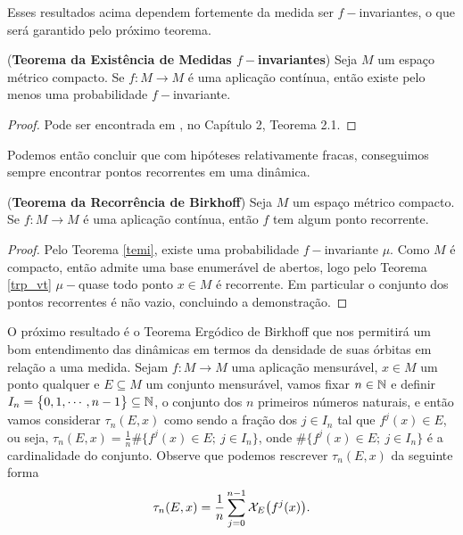 Esses resultados acima dependem fortemente da medida ser $f-$invariantes, o que será garantido pelo próximo teorema.

\begin{teorema}\label{temi}(\textbf{Teorema da Existência de Medidas $f-$invariantes}) Seja $M$ um espaço métrico compacto. Se $f:M\to M$ é uma aplicação contínua, então existe pelo menos uma probabilidade $f-$invariante.
\end{teorema}

\begin{proof} Pode ser encontrada em \cite{viana}, no Capítulo 2, Teorema 2.1.
\end{proof}

Podemos então concluir que com hipóteses relativamente fracas, conseguimos sempre encontrar pontos recorrentes em uma dinâmica.

\begin{corolario}\label{trb} (\textbf{Teorema da Recorrência de Birkhoff}) Seja $M$ um espaço métrico compacto. Se $f:M\to M$ é uma aplicação contínua, então $f$ tem algum ponto recorrente.
\end{corolario}

\begin{proof} Pelo Teorema \ref{temi}, existe uma probabilidade $f-$invariante $\mu$. Como $M$ é compacto, então admite uma base enumerável de abertos, logo pelo Teorema \ref{trp_vt} $\mu-$quase todo ponto $x\in M$ é recorrente. Em particular o conjunto dos pontos recorrentes é não vazio, concluindo a demonstração.
\end{proof}

O próximo resultado é o Teorema Ergódico de Birkhoff que nos permitirá um bom entendimento das dinâmicas em termos da densidade de suas órbitas em relação a uma medida. Sejam $f:M\to M$ uma aplicação mensurável, $x\in M$ um ponto qualquer e $E\subseteq M$ um conjunto mensurável, vamos fixar $n\in\mathbb{N}$ e definir $I_n=\big\{0,1,\cdots,n-1\big\}\subseteq\mathbb{N}$, o conjunto dos $n$ primeiros números naturais, e então vamos considerar $\tau_n(E,x)$ como sendo a fração dos $j\in I_n$ tal que $f^j(x)\in E$, ou seja, $\tau_n(E,x) = \frac{1}{n}\#\big\{f^j(x)\in E;\ j\in I_n\big\}$, onde $\#\big\{f^j(x)\in E;\ j\in I_n\big\}$ é a cardinalidade do conjunto. Observe que podemos rescrever $\tau_n(E,x)$ da seguinte forma
\begin{equation}\label{L40}
\tau_n(E,x) = \dfrac{1}{n}\sum_{j=0}^{n-1}\mathcal{X}_{E}\big(f^j(x)\big).
\end{equation}

